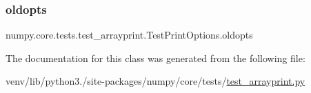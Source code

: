 \subsubsection{\texorpdfstring{oldopts}{oldopts}}
{\footnotesize\ttfamily numpy.\+core.\+tests.\+test\+\_\+arrayprint.\+Test\+Print\+Options.\+oldopts}



The documentation for this class was generated from the following file\+:\begin{DoxyCompactItemize}
\item 
venv/lib/python3./site-\/packages/numpy/core/tests/\hyperlink{test__arrayprint_8py}{test\+\_\+arrayprint.\+py}\end{DoxyCompactItemize}
